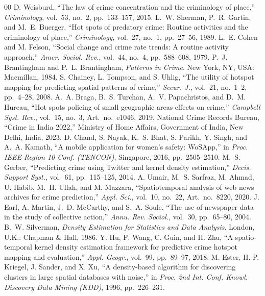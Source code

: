 \documentclass[conference]{IEEEtran}
\begin{document}
\begin{thebibliography}{00}
 D. Weisburd, ``The law of crime concentration and the criminology of place,'' \emph{Criminology}, vol.~53, no.~2, pp.~133--157, 2015.
 L.~W. Sherman, P.~R. Gartin, and M.~E. Buerger, ``Hot spots of predatory crime: Routine activities and the criminology of place,'' \emph{Criminology}, vol.~27, no.~1, pp.~27--56, 1989.
 L.~E. Cohen and M. Felson, ``Social change and crime rate trends: A routine activity approach,'' \emph{Amer. Sociol. Rev.}, vol.~44, no.~4, pp.~588--608, 1979.
 P.~J. Brantingham and P.~L. Brantingham, \emph{Patterns in Crime}. New York, NY, USA: Macmillan, 1984.
 S. Chainey, L. Tompson, and S. Uhlig, ``The utility of hotspot mapping for predicting spatial patterns of crime,'' \emph{Secur. J.}, vol.~21, no.~1--2, pp.~4--28, 2008.
 A.~A. Braga, B.~S. Turchan, A.~V. Papachristos, and D.~M. Hureau, ``Hot spots policing of small geographic areas effects on crime,'' \emph{Campbell Syst. Rev.}, vol.~15, no.~3, Art.~no.~e1046, 2019.
 National Crime Records Bureau, ``Crime in India 2022,'' Ministry of Home Affairs, Government of India, New Delhi, India, 2023.
 D. Chand, S. Nayak, K.~S. Bhat, S. Parikh, Y. Singh, and A.~A. Kamath, ``A mobile application for women's safety: WoSApp,'' in \emph{Proc. IEEE Region 10 Conf. (TENCON)}, Singapore, 2016, pp.~2505--2510.
 M.~S. Gerber, ``Predicting crime using Twitter and kernel density estimation,'' \emph{Decis. Support Syst.}, vol.~61, pp.~115--125, 2014.
 A. Umair, M.~S. Sarfraz, M. Ahmad, U. Habib, M.~H. Ullah, and M. Mazzara, ``Spatiotemporal analysis of web news archives for crime prediction,'' \emph{Appl. Sci.}, vol.~10, no.~22, Art.~no.~8220, 2020.
 J. Earl, A. Martin, J.~D. McCarthy, and S.~A. Soule, ``The use of newspaper data in the study of collective action,'' \emph{Annu. Rev. Sociol.}, vol.~30, pp.~65--80, 2004.
 B.~W. Silverman, \emph{Density Estimation for Statistics and Data Analysis}. London, U.K.: Chapman \& Hall, 1986.
 Y. Hu, F. Wang, C. Guin, and H. Zhu, ``A spatio-temporal kernel density estimation framework for predictive crime hotspot mapping and evaluation,'' \emph{Appl. Geogr.}, vol.~99, pp.~89--97, 2018.
 M. Ester, H.-P. Kriegel, J. Sander, and X. Xu, ``A density-based algorithm for discovering clusters in large spatial databases with noise,'' in \emph{Proc. 2nd Int. Conf. Knowl. Discovery Data Mining (KDD)}, 1996, pp.~226--231.

\end{thebibliography}
\end{document}

